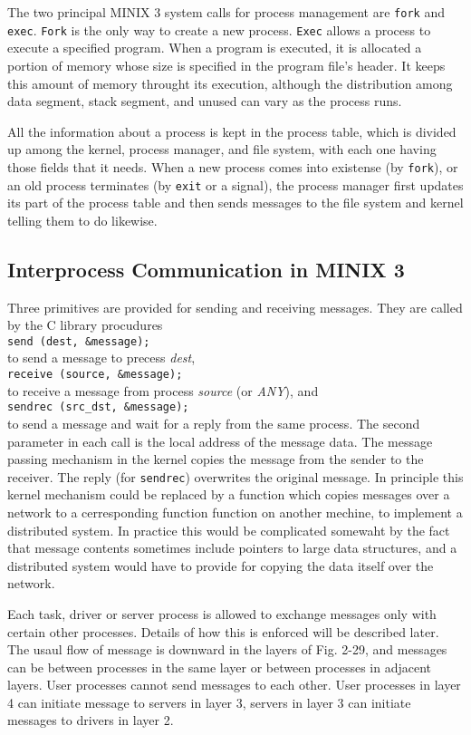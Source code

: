 \documentclass{book}
\newcommand {\sys} [1] {\textsl{#1}}
\newcommand {\cmd} [1] {\texttt{#1}}
\begin{document}
The two principal MINIX 3 system calls for process management are \cmd{fork} and \cmd{exec}.
\cmd{Fork} is the only way to create a new process.
\cmd{Exec} allows a process to execute a specified program.
When a program is executed, it is allocated a portion of memory whose size is specified in the program file's header.
It keeps this amount of memory throught its execution, 
although the distribution among data segment, stack segment, and unused can vary as the process runs.

All the information about a process is kept in the process table, which is divided up among the kernel, process manager, and file system,
with each one having those fields that it needs.
When a new process comes into existense (by \cmd{fork}),
or an old process terminates (by \cmd{exit} or a signal),
the process manager first updates its part of the process table and then sends messages to the file system and kernel telling them to do likewise.

\subsection{Interprocess Communication in MINIX 3}
Three primitives are provided for sending and receiving messages.
They are called by the C library procudures\\
\cmd{send (dest, \&message);}\\
to send a message to precess \sys{dest},\\
\cmd{receive (source, \&message);}\\
to receive a message from process \sys{source} (or \sys{ANY}), and\\
\cmd{sendrec (src\_dst, \&message);}\\
to send a message and wait for a reply from the same process.
The second parameter in each call is the local address of the message data.
The message passing mechanism in the kernel copies the message from the sender to the receiver.
The reply (for \cmd{sendrec}) overwrites the original message.  
In principle this kernel mechanism could be replaced by a function 
which copies messages over a network to a cerresponding function function on another mechine, to implement a distributed system.
In practice this would be complicated somewaht by the fact that
message contents sometimes include pointers to large data structures,
and a distributed system would have to provide for copying the data itself over the network.

Each task, driver or server process is allowed to exchange messages only with certain other processes.
Details of how this is enforced will be described later.
The usaul flow of message is downward in the layers of Fig. 2-29,
and messages can be between processes in the same layer or between processes in adjacent layers.
User processes cannot send messages to each other.
User processes in layer 4 can initiate message to servers in layer 3, servers in layer 3 can initiate messages to drivers in layer 2.
\end{document}
